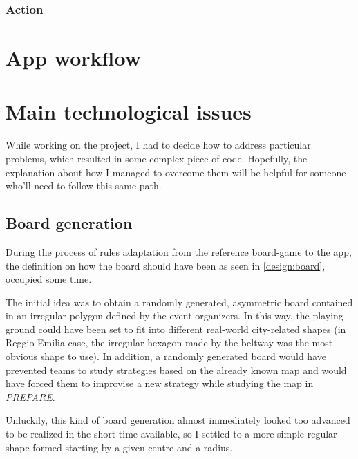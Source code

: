 			\subsubsection{Action}
			
	\section{App workflow}
	
	
	\section{Main technological issues}
		
		While working on the project, I had to decide how to address particular problems, which resulted in some complex piece of code.
		Hopefully, the explanation about how I managed to overcome them will be helpful for someone who'll need to follow this same path.
		
		\subsection{Board generation}\label{focus:board}
		
			During the process of rules adaptation from the reference board-game to the app, the definition on how the board should have been as seen in \autoref{design:board}, occupied some time.
			
			The initial idea was to obtain a randomly generated, asymmetric board contained in an irregular polygon defined by the event organizers.
			In this way, the playing ground could have been set to fit into different real-world city-related shapes (in Reggio Emilia case, the irregular hexagon made by the beltway was the most obvious shape to use).
			In addition, a randomly generated board would have prevented teams to study strategies based on the already known map and would have forced them to improvise a new strategy while studying the map in \emph{PREPARE}.
			
			Unluckily, this kind of board generation almost immediately looked too advanced to be realized in the short time available, so I settled to a more simple regular shape formed starting by a given centre and a radius.
			
